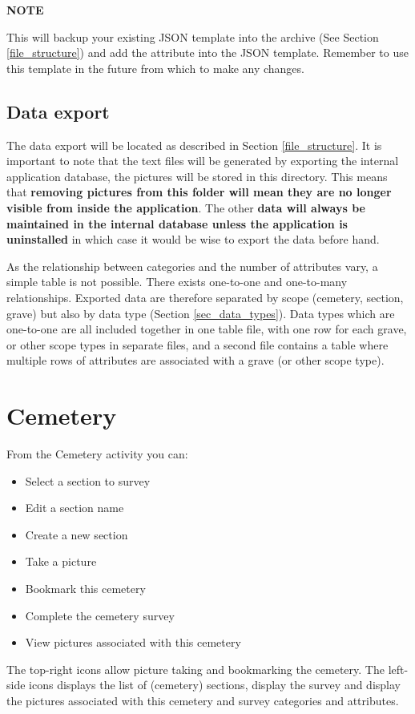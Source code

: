 \documentclass{scrreprt}
\begin{document}
\textbf{NOTE}

This will backup your existing JSON template into the archive (See Section \ref{file_structure}) and add the attribute into the JSON template. Remember to use this template in the future from which to make any changes.

\subsection{Data export}
The data export will be located as described in Section \ref{file_structure}. It is important to note that the text files will be generated by exporting the internal application database, the pictures will be stored in this directory. This means that \textbf{removing pictures from this folder will mean they are no longer visible from inside the application}. The other \textbf{data will always be maintained in the internal database unless the application is uninstalled} in which case it would be wise to export the data before hand.

As the relationship between categories and the number of attributes vary, a simple table is not possible. There exists one-to-one and one-to-many relationships. Exported data are therefore separated by scope (cemetery, section, grave) but also by data type (Section \ref{sec_data_types}). Data types which are one-to-one are all included together in one table file, with one row for each grave, or other scope types in separate files, and a second file contains a table where multiple rows of attributes are associated with a grave (or other scope type).

\section{Cemetery}
From the Cemetery activity you can:
\begin{itemize}
\item Select a section to survey
\item Edit a section name
\item Create a new section
\item Take a picture
\item Bookmark this cemetery
\item Complete the cemetery survey
\item View pictures associated with this cemetery
\end{itemize}

The top-right icons allow picture taking and bookmarking the cemetery. The left-side icons displays the list of (cemetery) sections, display the survey and display the pictures associated with this cemetery and survey categories and attributes.
\end{document}
